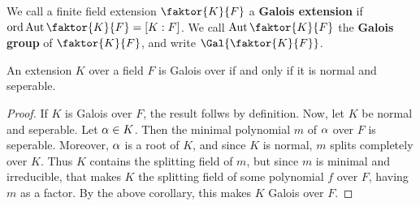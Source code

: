 \begin{definition}
    We call a finite field extension $\faktor{K}{F}$ a \textbf{Galois extension}
    if $\ord{\Aut{\faktor{K}{F}}}=[K:F]$. We call $\Aut{\faktor{K}{F}}$ the
    \textbf{Galois group} of $\faktor{K}{F}$, and write $\Gal{\faktor{K}{F}}$.
\end{definition}

\begin{proposition}\label{2.1.6}
    An extension $K$ over a field $F$ is Galois over if and only if it is normal
    and seperable.
\end{proposition}
\begin{proof}
    If $K$ is Galois over $F$, the result follws by definition. Now, let $K$ be
    normal and seperable. Let $\alpha \in K$. Then the minimal polynomial $m$ of
    $\alpha$ over $F$ is seperable. Moreover, $\alpha$ is a root of $K$, and since $K$
    is normal, $m$ splits completely over $K$. Thus $K$ contains the splitting
    field of $m$, but since $m$ is minimal and irreducible, that makes  $K$ the
    splitting field of some polynomial $f$ over $F$, having $m$ as a factor. By
    the above corollary, this makes $K$ Galois over  $F$.
\end{proof}

